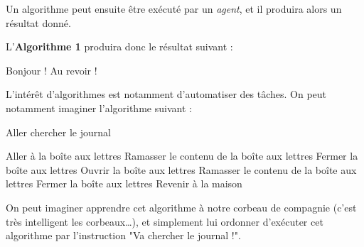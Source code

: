 \documentclass[../../main.tex]{subfiles}
\begin{document}
Un algorithme peut ensuite être exécuté par un \textit{agent}, et il produira alors un résultat donné.


L'\textbf{Algorithme 1} produira donc le résultat suivant :

\begin{minipage}{1.\textwidth} \selectfont
	Bonjour !\newline
	Au revoir !
\end{minipage}

L'intérêt d'algorithmes est notamment d'automatiser des tâches. On peut notamment imaginer l'algorithme suivant :
\newline
\begin{algorithm}
\caption{Aller chercher le journal}\label{alg:letters}
Aller à la boîte aux lettres\;
 {
	Ramasser le contenu de la boîte aux lettres\;
	Fermer la boîte aux lettres\;
} {
	Ouvrir la boîte aux lettres\;
	Ramasser le contenu de la boîte aux lettres\;
	Fermer la boîte aux lettres\;
}
Revenir à la maison\;
\end{algorithm}

On peut imaginer apprendre cet algorithme à notre corbeau de compagnie (c'est très intelligent les corbeaux\dots), et simplement lui ordonner d'exécuter cet algorithme par l'instruction "Va chercher le journal !".
\end{document}
